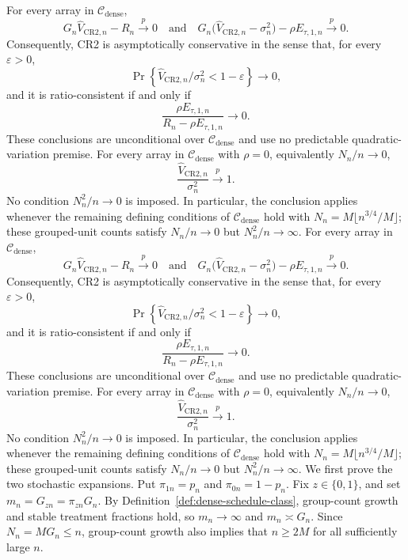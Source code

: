 For every array in \(\mathcal C_{\mathrm{dense}}\),
\[
 G_n\widehat V_{\mathrm{CR2},n}-R_n\xrightarrow{p}0
 \quad\text{and}\quad
 G_n\bigl(\widehat V_{\mathrm{CR2},n}-\sigma_n^2\bigr)
   -\rho E_{\tau,1,n}\xrightarrow{p}0.
\]
Consequently, CR2 is asymptotically conservative in the sense that, for every \(\varepsilon>0\),
\[
 \Pr\!\left\{
   \widehat V_{\mathrm{CR2},n}/\sigma_n^2<1-\varepsilon
 \right\}\longrightarrow0,
\]
and it is ratio-consistent if and only if
\[
 \frac{\rho E_{\tau,1,n}}{R_n-\rho E_{\tau,1,n}}\longrightarrow0.
\]
These conclusions are unconditional over \(\mathcal C_{\mathrm{dense}}\) and use no predictable quadratic-variation premise.
For every array in \(\mathcal C_{\mathrm{dense}}\) with \(\rho=0\), equivalently \(N_n/n\to0\),
\[
 \frac{\widehat V_{\mathrm{CR2},n}}{\sigma_n^2}\xrightarrow{p}1.
\]
No condition \(N_n^2/n\to0\) is imposed.  In particular, the conclusion applies whenever the remaining defining conditions of \(\mathcal C_{\mathrm{dense}}\) hold with \(N_n=M\lfloor n^{3/4}/M\rfloor\); these grouped-unit counts satisfy \(N_n/n\to0\) but \(N_n^2/n\to\infty\).
For every array in \(\mathcal C_{\mathrm{dense}}\),
\[
 G_n\widehat V_{\mathrm{CR2},n}-R_n\xrightarrow{p}0
 \quad\text{and}\quad
 G_n\bigl(\widehat V_{\mathrm{CR2},n}-\sigma_n^2\bigr)
   -\rho E_{\tau,1,n}\xrightarrow{p}0.
\]
Consequently, CR2 is asymptotically conservative in the sense that, for every \(\varepsilon>0\),
\[
 \Pr\!\left\{
   \widehat V_{\mathrm{CR2},n}/\sigma_n^2<1-\varepsilon
 \right\}\longrightarrow0,
\]
and it is ratio-consistent if and only if
\[
 \frac{\rho E_{\tau,1,n}}{R_n-\rho E_{\tau,1,n}}\longrightarrow0.
\]
These conclusions are unconditional over \(\mathcal C_{\mathrm{dense}}\) and use no predictable quadratic-variation premise.
For every array in \(\mathcal C_{\mathrm{dense}}\) with \(\rho=0\), equivalently \(N_n/n\to0\),
\[
 \frac{\widehat V_{\mathrm{CR2},n}}{\sigma_n^2}\xrightarrow{p}1.
\]
No condition \(N_n^2/n\to0\) is imposed.  In particular, the conclusion applies whenever the remaining defining conditions of \(\mathcal C_{\mathrm{dense}}\) hold with \(N_n=M\lfloor n^{3/4}/M\rfloor\); these grouped-unit counts satisfy \(N_n/n\to0\) but \(N_n^2/n\to\infty\).
We first prove the two stochastic expansions.  Put \(\pi_{1n}=p_n\) and \(\pi_{0n}=1-p_n\).  Fix \(z\in\{0,1\}\), and set \(m_n=G_{zn}=\pi_{zn}G_n\).  By Definition~\ref{def:dense-schedule-class}, group-count growth and stable treatment fractions hold, so \(m_n\to\infty\) and \(m_n\asymp G_n\).  Since \(N_n=MG_n\le n\), group-count growth also implies that \(n\ge2M\) for all sufficiently large \(n\).

